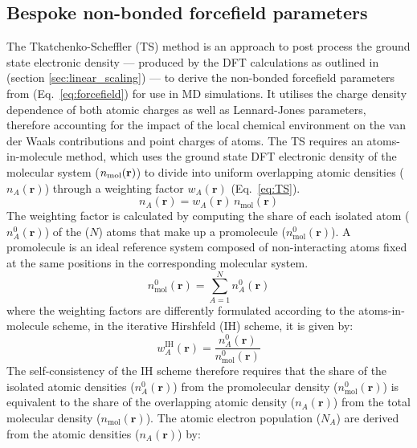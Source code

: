 \subsection{Bespoke non-bonded forcefield parameters}\label{sec:ddec}
%
The Tkatchenko-Scheffler (TS) method is an approach to post process the ground state electronic density --- produced by the DFT calculations as outlined in (section \ref{sec:linear_scaling}) --- to derive the non-bonded forcefield parameters from (Eq.~\ref{eq:forcefield}) for use in MD simulations.\cite{tkatchenko2009accurate} It utilises the charge density dependence of both atomic charges as well as Lennard-Jones parameters, therefore accounting for the impact of the local chemical environment on the van der Waals contributions and point charges of atoms. The TS  requires an atoms-in-molecule method, which uses the ground state DFT electronic density of the molecular system ($n_{\rm{mol}}(\mathbf{r})$) to divide into uniform overlapping atomic densities ($n_{A}(\mathbf{r})$) through a weighting factor $w_{A}(\mathbf{r})$ (Eq.~\ref{eq:TS}).\cite{tkatchenko2009accurate,manz2012improved}
%
\begin{equation} \label{eq:TS}
n_{A}(\mathbf{r})=w_{A}(\mathbf{r})\,n_{\mathrm{mol}}(\mathbf{r})
\end{equation}
%
The weighting factor is calculated by computing the share of each isolated atom ($n_{A}^0(\mathbf{r})$) of the ($N$) atoms that make up a promolecule ($n_{\mathrm{mol}}^0(\mathbf{r})$). A promolecule is an ideal reference system composed of non-interacting atoms fixed at the same positions in the corresponding molecular system.
\begin{equation}
    n_{\mathrm{mol}}^0(\mathbf{r}) = \sum_{A=1}^N n_{A}^0(\mathbf{r})
\end{equation}
where the weighting factors are differently formulated according to the atoms-in-molecule scheme, in the iterative Hirshfeld (IH) scheme,\cite{bultinck2007uniqueness} it is given by:
\begin{equation}
    w_{A}^{\mathrm{IH}}(\mathbf{r}) = \frac{n_{A}^0(\mathbf{r})}{n_{\mathrm{mol}}^0(\mathbf{r})}
\end{equation}
The self-consistency of the IH scheme therefore requires that the share of the isolated atomic densities ($n_{A}^0(\mathbf{r})$) from the promolecular density ($n_{\mathrm{mol}}^0(\mathbf{r})$) is equivalent to the share of the overlapping atomic density ($n_{A}(\mathbf{r})$) from the total molecular density ($n_{\mathrm{mol}}(\mathbf{r})$). The atomic electron population ($N_A$) are derived from the atomic densities ($n_{A}(\mathbf{r})$) by:
